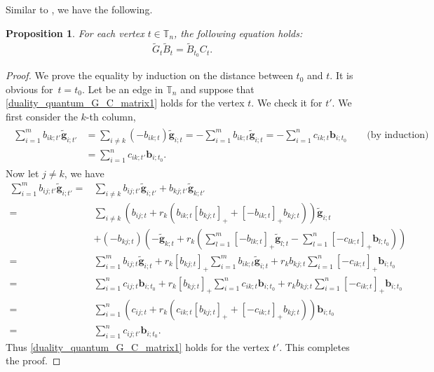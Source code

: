 \documentclass[10pt,a4paper]{amsart}
\numberwithin{equation}{section}
\newtheorem{Proposition}[Theorem]{Proposition}
 { \theoremstyle{definition}
\newtheorem{Definition}[Theorem]{Definition}
\newtheorem{Note}[Theorem]{Note}
\newtheorem{Example}[Theorem]{Example}
\newtheorem{Remark}[Theorem]{Remark} }
\begin{document}
Similar to \cite[equation (6.14)]{fomin_zelevinsky_2007}, we have the following.
\begin{Proposition}
 For each vertex $t\in \mathbb{T}_n$, the following equation holds:
 \begin{align}\label{duality_quantum_G_C_matrix1}
 \tilde{G}_{t}\tilde{B}_{t}=\tilde{B}_{t_0}C_{t}.
 \end{align}
\end{Proposition}
\begin{proof}

 We prove the equality by induction on the distance between $t_0$ and $t$.
 It is obvious for~${t=t_0}$. Let  be an edge in $\mathbb{T}_n$ and suppose that \eqref{duality_quantum_G_C_matrix1} holds for the vertex $t$. We check it for $t'$. We first consider the $k$-th column,
 \begin{align*}
 \begin{aligned}
 \sum\limits^{m}_{i=1}b_{ik;t'}\mathbf{\tilde{g}}_{i;t'}
 &=\sum\limits_{i\neq k}(-b_{ik;t})\mathbf{\tilde{g}}_{i;t}=-\sum\limits^{m}_{i=1}b_{ik;t}\mathbf{\tilde{g}}_{i;t}=-\sum\limits^{n}_{i=1}c_{ik;t}\mathbf{b}_{i;t_0}\qquad
 \text{(by induction)}\\
 &=\sum\limits^{n}_{i=1}c_{ik;t'}\mathbf{b}_{i;t_0}.
 \end{aligned}
 \end{align*}
 Now let $j\neq k$, we have
 \begin{align*}
 \sum\limits^{m}_{i=1}b_{ij;t'}\mathbf{\tilde{g}}_{i;t'}
 ={}&\sum\limits_{i\neq k}b_{ij;t'}\mathbf{\tilde{g}}_{i;t'}+b_{kj;t'}\mathbf{\tilde{g}}_{k;t'}\\
 ={}&\sum\limits_{i\neq k}(b_{ij;t}+r_{k}(b_{ik;t}[b_{kj;t}]_{+}+[-b_{ik;t}]_{+}b_{kj;t}))\mathbf{\tilde{g}}_{i;t}\\
 & +(-b_{kj;t})\left(-\mathbf{\tilde{g}}_{k;t}+r_{k}\left(\sum\limits^{m}_{l=1}[-b_{lk;t}]_{+}\mathbf{\tilde{g}}_{l;t}-\sum\limits^{n}_{l=1}[-c_{lk;t}]_{+}\mathbf{b}_{l;t_0}\right)\right)\\
 ={}&\sum\limits^{m}_{i=1}b_{ij;t}\mathbf{\tilde{g}}_{i;t}+r_{k}[b_{kj;t}]_{+}\sum\limits^{m}_{i=1}b_{ik;t}\mathbf{\tilde{g}}_{i;t}+r_{k}b_{kj;t}\sum\limits^{n}_{i=1}[-c_{ik;t}]_{+}\mathbf{b}_{i;t_0}\\
 ={}&\sum\limits_{i=1}^{n}c_{ij;t}\mathbf{b}_{i;t_0}+r_{k}[b_{kj;t}]_{+}\sum\limits^{n}_{i=1}c_{ik;t}\mathbf{b}_{i;t_0}+r_{k}b_{kj;t}\sum\limits^{n}_{i=1}[-c_{ik;t}]_{+}\mathbf{b}_{i;t_0}\\
 ={}&\sum\limits_{i=1}^{n}(c_{ij;t}+r_{k}(c_{ik;t}[b_{kj;t}]_{+}+[-c_{ik;t}]_{+}b_{kj;t}))\mathbf{b}_{i;t_0}\\
 ={}&\sum\limits_{i=1}^{n}c_{ij;t'}\mathbf{b}_{i;t_0}.
 \end{align*}
 Thus \eqref{duality_quantum_G_C_matrix1} holds for the vertex $t'$. This completes the proof.
\end{proof}
\end{document}
